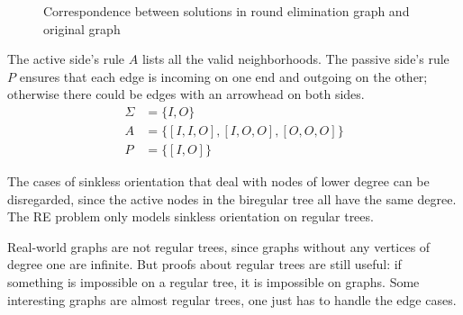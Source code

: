 \documentclass[english, 12pt, a4paper, sci, a-1b, online]{aaltothesis}
\begin{document}
\begin{figure}[h]
\centering
{}
\caption{Correspondence between solutions in round elimination graph and original graph}
\end{figure}

The active side's rule $A$ lists all the valid neighborhoods. The passive side's rule $P$ ensures that each edge is incoming on one end and outgoing on the other; otherwise there could be edges with an arrowhead on both sides.
\begin{align*}
\Sigma &= \{I, O\} \\
A &= \{[I, I, O], [I, O, O], [O, O, O]\} \\
P &= \{[I, O]\}
\end{align*}

The cases of sinkless orientation that deal with nodes of lower degree can be disregarded, since the active nodes in the biregular tree all have the same degree. The RE problem only models sinkless orientation on regular trees.

Real-world graphs are not regular trees, since graphs without any vertices of degree one are infinite. But proofs about regular trees are still useful: if something is impossible on a regular tree, it is impossible on graphs. Some interesting graphs are almost regular trees, one just has to handle the edge cases.
\end{document}

